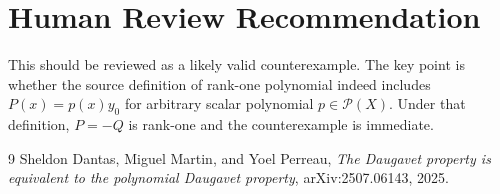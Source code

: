 \documentclass[11pt]{article}
\newcommand{\Pol}{\mathcal P}
\begin{document}
\section*{Human Review Recommendation}

This should be reviewed as a likely valid counterexample.  The key point is
whether the source definition of rank-one polynomial indeed includes
\(P(x)=p(x)y_0\) for arbitrary scalar polynomial \(p\in\Pol(X)\).  Under that
definition, \(P=-Q\) is rank-one and the counterexample is immediate.

\begin{thebibliography}{9}
Sheldon Dantas, Miguel Martin, and Yoel Perreau,
\emph{The Daugavet property is equivalent to the polynomial Daugavet property},
arXiv:2507.06143, 2025.
\end{thebibliography}
\end{document}
